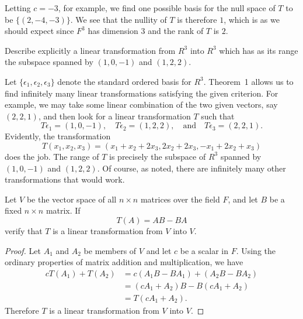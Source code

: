 \begin{enumerate}
\begin{solution}
    Letting $c = -3$, for example, we find one possible basis for the
    null space of $T$ to be $\{(2, -4, -3)\}$. We see that the nullity
    of $T$ is therefore $1$, which is as we should expect since $F^3$
    has dimension $3$ and the rank of $T$ is $2$.
  \end{solution}
\end{enumerate}

 Describe explicitly a linear transformation from $R^3$ into
$R^3$ which has as its range the subspace spanned by $(1, 0, -1)$ and
$(1, 2, 2)$.
\begin{solution}
  Let $\{\epsilon_1, \epsilon_2, \epsilon_3\}$ denote the standard
  ordered basis for $R^3$. Theorem~1 allows us to find infinitely many
  linear transformations satisfying the given criterion. For example,
  we may take some linear combination of the two given vectors, say
  $(2, 2, 1)$, and then look for a linear transformation $T$ such
  that
  \begin{equation*}
    T\epsilon_1 = (1, 0, -1),
    \quad
    T\epsilon_2 = (1, 2, 2),
    \quad\text{and}\quad
    T\epsilon_3 = (2, 2, 1).
  \end{equation*}
  Evidently, the transformation
  \begin{equation*}
    T(x_1, x_2, x_3) =
    (x_1 + x_2 + 2x_3, 2x_2 + 2x_3, -x_1 + 2x_2 + x_3)
  \end{equation*}
  does the job. The range of $T$ is precisely the subspace of $R^3$
  spanned by $(1, 0, -1)$ and $(1, 2, 2)$. Of course, as noted, there
  are infinitely many other transformations that would work.
\end{solution}

 Let $V$ be the vector space of all $n\times n$ matrices
over the field $F$, and let $B$ be a fixed $n\times n$ matrix. If
\begin{equation*}
  T(A) = AB - BA
\end{equation*}
verify that $T$ is a linear transformation from $V$ into $V$.
\begin{proof}
  Let $A_1$ and $A_2$ be members of $V$ and let $c$ be a scalar in
  $F$. Using the ordinary properties of matrix addition and
  multiplication, we have
  \begin{align*}
    cT(A_1) + T(A_2)
    &= c(A_1B - BA_1) + (A_2B - BA_2) \\
    &= (cA_1 + A_2)B - B(cA_1 + A_2) \\
    &= T(cA_1 + A_2).
  \end{align*}
  Therefore $T$ is a linear transformation from $V$ into $V$.
\end{proof}

